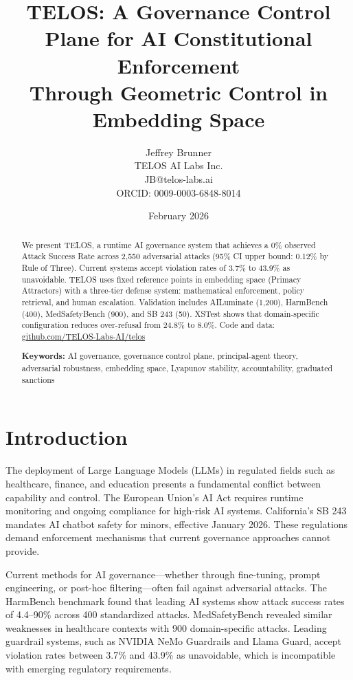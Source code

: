 \documentclass[11pt,twocolumn]{article}
\title{TELOS: A Governance Control Plane for AI Constitutional Enforcement\\Through Geometric Control in Embedding Space}
\author{Jeffrey Brunner\\TELOS AI Labs Inc.\\JB@telos-labs.ai\\ORCID: 0009-0003-6848-8014}
\date{February 2026}
\begin{document}
\maketitle

\begin{abstract}
We present TELOS, a runtime AI governance system that achieves a 0\% observed Attack Success Rate across 2,550 adversarial attacks (95\% CI upper bound: 0.12\% by Rule of Three). Current systems accept violation rates of 3.7\% to 43.9\% as unavoidable. TELOS uses fixed reference points in embedding space (Primacy Attractors) with a three-tier defense system: mathematical enforcement, policy retrieval, and human escalation. Validation includes AILuminate (1,200), HarmBench (400), MedSafetyBench (900), and SB 243 (50). XSTest shows that domain-specific configuration reduces over-refusal from 24.8\% to 8.0\%. Code and data: \url{github.com/TELOS-Labs-AI/telos}

\textbf{Keywords:} AI governance, governance control plane, principal-agent theory, adversarial robustness, embedding space, Lyapunov stability, accountability, graduated sanctions
\end{abstract}

\section{Introduction}

The deployment of Large Language Models (LLMs) in regulated fields such as healthcare, finance, and education presents a fundamental conflict between capability and control. The European Union's AI Act requires runtime monitoring and ongoing compliance for high-risk AI systems. California's SB 243 mandates AI chatbot safety for minors, effective January 2026. These regulations demand enforcement mechanisms that current governance approaches cannot provide.

Current methods for AI governance---whether through fine-tuning, prompt engineering, or post-hoc filtering---often fail against adversarial attacks. The HarmBench benchmark found that leading AI systems show attack success rates of 4.4--90\% across 400 standardized attacks. MedSafetyBench revealed similar weaknesses in healthcare contexts with 900 domain-specific attacks. Leading guardrail systems, such as NVIDIA NeMo Guardrails and Llama Guard, accept violation rates between 3.7\% and 43.9\% as unavoidable, which is incompatible with emerging regulatory requirements.
\end{document}
